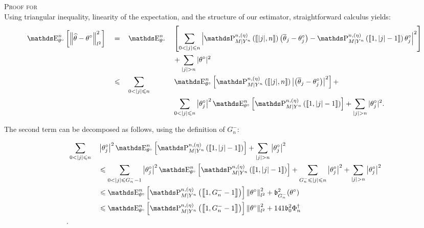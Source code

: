 \begin{pro}{\textsc{Proof for } \\}\label{PROD.5.1}
Using triangular inequality, linearity of the expectation, and the structure of our estimator, straightforward calculus yields:
\begin{alignat*}{4}
& \E_{\theta^{\circ}}^{n}\left[\left\Vert \widehat{\theta} - \theta^{\circ}\right\Vert_{l^{2}}^{2}\right] && = && \E_{\theta^{\circ}}^{n}&&\left[\sum\limits_{0 < \vert j \vert \leq n} \left\vert \P_{M \vert Y^{n}}^{n, (\eta)} \left(\llbracket \vert j \vert, n \rrbracket \right) \left(\overline{\theta}_{j} - \theta^{\circ}_{j}\right) - \P_{M \vert Y^{n}}^{n, (\eta)} \left(\llbracket 1, \vert j \vert - 1 \rrbracket \right) \theta^{\circ}_{j}\right\vert^{2} \right]\\
& && && && + \sum\limits_{\vert j \vert > n} \vert \theta^{\circ} \vert^{2}\\
& && \leq && \sum\limits_{0 < \vert j \vert \leq n}&& \E_{\theta^{\circ}}^{n}\left[\P_{M \vert Y^{n}}^{n, (\eta)} \left(\llbracket \vert j \vert, n \rrbracket\right) \left\vert  \left(\overline{\theta}_{j} - \theta^{\circ}_{j}\right) \right\vert^{2}\right] +\\
& && && && \sum\limits_{0 < \vert j \vert \leq n} \left\vert \theta^{\circ}_{j}\right\vert^{2} \E_{\theta^{\circ}}^{n}\left[\P_{M \vert Y^{n}}^{n, (\eta)} \left(\llbracket 1, \vert j \vert - 1 \rrbracket\right) \right] + \sum\limits_{\vert j \vert > n} \vert \theta^{\circ}_{j} \vert^{2}.
\end{alignat*}

The second term can be decomposed as follows, using the definition of $G^{-}_{n}$:

\begin{alignat*}{2}
& \sum\limits_{0 < \vert j \vert \leq n} &&\left\vert \theta^{\circ}_{j} \right\vert^{2} \E_{\theta^{\circ}}^{n}\left[\P_{M \vert Y^{n}}^{n, (\eta)} \left(\left\llbracket 1, \vert j \vert - 1\right\rrbracket \right) \right] + \sum\limits_{\vert j \vert > n} \left\vert \theta^{\circ}_{j} \right\vert^{2}\\
& && \leq \sum\limits_{0 < \vert j \vert \leq G^{-}_{n} - 1} \left\vert \theta^{\circ}_{j} \right\vert^{2} \E_{\theta^{\circ}}^{n}\left[\P_{M \vert Y^{n}}^{n, (\eta)} \left(\left\llbracket 1, \vert j \vert - 1\right\rrbracket \right) \right] + \sum\limits_{G^{-}_{n} \leq \vert j \vert \leq n} \left\vert \theta^{\circ}_{j}\right\vert^{2} + \sum\limits_{\vert j \vert > n} \left\vert \theta^{\circ}_{j} \right\vert^{2}\\
& && \leq \E_{\theta^{\circ}}^{n}\left[\P_{M \vert Y^{n}}^{n, (\eta)} \left(\left\llbracket 1, G^{-}_{n} - 1\right\rrbracket \right) \right] \left\Vert \theta^{\circ} \right\Vert_{l^{2}}^{2} + \mathfrak{b}_{G^{-}_{n}}^{2}(\theta^{\circ})\\
& && \leq \E_{\theta^{\circ}}^{n}\left[\P_{M \vert Y^{n}}^{n, (\eta)} \left(\left\llbracket 1, G^{-}_{n} - 1\right\rrbracket \right) \right] \left\Vert \theta^{\circ} \right\Vert_{l^{2}}^{2} + 141 \mathfrak{b}_{0}^{2} \Phi^{\dagger}_{n}\\.
\end{alignat*}


\end{pro}
